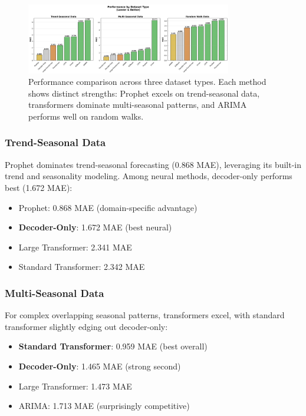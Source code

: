 \documentclass[11pt]{article}
\begin{document}
\begin{figure}[h]
\centering
\includegraphics[width=0.8\textwidth]{results/figure3_dataset_performance.png}
\caption{Performance comparison across three dataset types. Each method shows distinct strengths: Prophet excels on trend-seasonal data, transformers dominate multi-seasonal patterns, and ARIMA performs well on random walks.}
\label{fig:dataset_performance}
\end{figure}

\subsubsection{Trend-Seasonal Data}

Prophet dominates trend-seasonal forecasting (0.868 MAE), leveraging its built-in trend and seasonality modeling. Among neural methods, decoder-only performs best (1.672 MAE):

\begin{itemize}
\item Prophet: 0.868 MAE (domain-specific advantage)
\item \textbf{Decoder-Only}: 1.672 MAE (best neural)
\item Large Transformer: 2.341 MAE
\item Standard Transformer: 2.342 MAE
\end{itemize}

\subsubsection{Multi-Seasonal Data}

For complex overlapping seasonal patterns, transformers excel, with standard transformer slightly edging out decoder-only:

\begin{itemize}
\item \textbf{Standard Transformer}: 0.959 MAE (best overall)
\item \textbf{Decoder-Only}: 1.465 MAE (strong second)
\item Large Transformer: 1.473 MAE
\item ARIMA: 1.713 MAE (surprisingly competitive)
\end{itemize}
\end{document}
